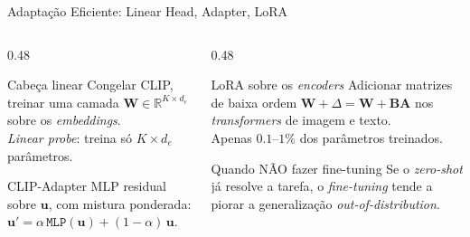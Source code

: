 \documentclass[aspectratio=169,xcolor=dvipsnames]{beamer}
\begin{document}
  \begin{frame}{Adaptação Eficiente: Linear Head, Adapter, LoRA}
    \begin{columns}[T]
      \begin{column}{0.48\textwidth}
        \begin{block}{Cabeça linear}
          Congelar CLIP, treinar uma camada $\mathbf{W} \in \mathbb{R}^{K \times d_e}$
          sobre os \textit{embeddings}.\\ \footnotesize
          \textit{Linear probe}: treina só $K \times d_e$ parâmetros.
        \end{block}
        \begin{block}{CLIP-Adapter}
          MLP residual sobre $\mathbf{u}$, com mistura ponderada:
          $\mathbf{u}' = \alpha\, \texttt{MLP}(\mathbf{u}) + (1-\alpha)\, \mathbf{u}$.
        \end{block}
      \end{column}
      \begin{column}{0.48\textwidth}
        \begin{block}{LoRA sobre os \textit{encoders}}
          Adicionar matrizes de baixa ordem $\mathbf{W} + \Delta = \mathbf{W} + \mathbf{B} \mathbf{A}$ nos
          \textit{transformers} de imagem e texto.\\
          \footnotesize Apenas $0.1$--$1\%$ dos parâmetros treinados.
        \end{block}
        \begin{alertblock}{Quando NÃO fazer fine-tuning}
          Se o \textit{zero-shot} já resolve a tarefa, o \textit{fine-tuning}
          tende a piorar a generalização \textit{out-of-distribution}.
        \end{alertblock}
      \end{column}
    \end{columns}
  \end{frame}
\end{document}
